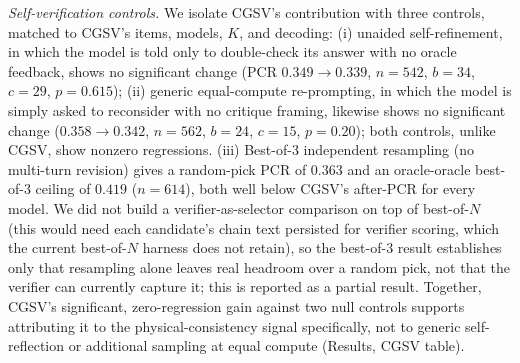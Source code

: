 \documentclass[pdflatex,sn-nature]{sn-jnl}
\begin{document}
\noindent\emph{Self-verification controls.} We isolate CGSV's contribution with three
controls, matched to CGSV's items, models, $K$, and decoding: (i) unaided
self-refinement, in which the model is told only to double-check its answer with no oracle
feedback, shows no significant change (PCR $0.349\to0.339$, $n=542$, $b=34$, $c=29$,
$p=0.615$); (ii) generic equal-compute re-prompting, in which the model is simply asked to
reconsider with no critique framing, likewise shows no significant change
($0.358\to0.342$, $n=562$, $b=24$, $c=15$, $p=0.20$); both controls, unlike CGSV, show
nonzero regressions. (iii) Best-of-3 independent resampling (no multi-turn revision) gives a
random-pick PCR of $0.363$ and an oracle-oracle best-of-3 ceiling of $0.419$ ($n=614$),
both well below CGSV's after-PCR for every model. We did not build a verifier-as-selector
comparison on top of best-of-$N$ (this would need each candidate's chain text persisted for
verifier scoring, which the current best-of-$N$ harness does not retain), so the
best-of-3 result establishes only that resampling alone leaves real headroom over a random
pick, not that the verifier can currently capture it; this is reported as a partial result. Together, CGSV's significant, zero-regression gain
against two null controls supports attributing it to the physical-consistency signal
specifically, not to generic self-reflection or additional sampling at equal compute
(Results, CGSV table).
\end{document}

